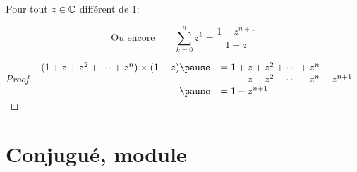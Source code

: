 \begin{frame}

\begin{proposition}
\label{prop:somme}
 Pour tout $z \in \mathbb{C}$ différent de $1$\!:\!\!\!\!
\end{proposition}
\pause
$$\text{Ou encore} \qquad \displaystyle \sum_{k=0}^n z^k = \dfrac{1 - z^{n + 1}}{1 - z}$$

\pause


\begin{proof}
\normalsize
$\begin{array}{rl}
(1 + z + z^2 + \cdots + z^n) \times (1 - z)
  \pause
  &= 1 + z + z^2 + \cdots + z^n \\
  &\hphantom{= 1 } -z -z^2 - \cdots - z^n - z^{n+1} \\
  \pause
  &= 1 - z^{n + 1}  \\
\end{array}$
\end{proof}

\end{frame}


\section{Conjugué, module}

